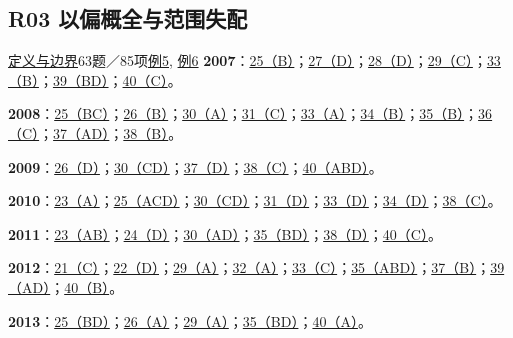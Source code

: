 \documentclass[11pt,a4paper]{article}
\begin{document}
\subsection{R03 以偏概全与范围失配}\label{class-R03}
\noindent \hyperref[cat-R03]{定义与边界}\quad 63题／85项\quad \hyperref[case-2008-T3-Q33]{例5}, \hyperref[case-2014-T4-Q38]{例6}
\noindent\textbf{2007}：\hyperref[idx-2007-T1-Q25]{25（B）}；\hyperref[idx-2007-T2-Q27]{27（D）}；\hyperref[idx-2007-T2-Q28]{28（D）}；\hyperref[idx-2007-T2-Q29]{29（C）}；\hyperref[idx-2007-T3-Q33]{33（B）}；\hyperref[idx-2007-T4-Q39]{39（BD）}；\hyperref[idx-2007-T4-Q40]{40（C）}。\par
\noindent\textbf{2008}：\hyperref[idx-2008-T1-Q25]{25（BC）}；\hyperref[idx-2008-T2-Q26]{26（B）}；\hyperref[idx-2008-T2-Q30]{30（A）}；\hyperref[idx-2008-T3-Q31]{31（C）}；\hyperref[idx-2008-T3-Q33]{33（A）}；\hyperref[idx-2008-T3-Q34]{34（B）}；\hyperref[idx-2008-T3-Q35]{35（B）}；\hyperref[idx-2008-T4-Q36]{36（C）}；\hyperref[idx-2008-T4-Q37]{37（AD）}；\hyperref[idx-2008-T4-Q38]{38（B）}。\par
\noindent\textbf{2009}：\hyperref[idx-2009-T2-Q26]{26（D）}；\hyperref[idx-2009-T2-Q30]{30（CD）}；\hyperref[idx-2009-T4-Q37]{37（D）}；\hyperref[idx-2009-T4-Q38]{38（C）}；\hyperref[idx-2009-T4-Q40]{40（ABD）}。\par
\noindent\textbf{2010}：\hyperref[idx-2010-T1-Q23]{23（A）}；\hyperref[idx-2010-T1-Q25]{25（ACD）}；\hyperref[idx-2010-T2-Q30]{30（CD）}；\hyperref[idx-2010-T3-Q31]{31（D）}；\hyperref[idx-2010-T3-Q33]{33（D）}；\hyperref[idx-2010-T3-Q34]{34（D）}；\hyperref[idx-2010-T4-Q38]{38（C）}。\par
\noindent\textbf{2011}：\hyperref[idx-2011-T1-Q23]{23（AB）}；\hyperref[idx-2011-T1-Q24]{24（D）}；\hyperref[idx-2011-T2-Q30]{30（AD）}；\hyperref[idx-2011-T3-Q35]{35（BD）}；\hyperref[idx-2011-T4-Q38]{38（D）}；\hyperref[idx-2011-T4-Q40]{40（C）}。\par
\noindent\textbf{2012}：\hyperref[idx-2012-T1-Q21]{21（C）}；\hyperref[idx-2012-T1-Q22]{22（D）}；\hyperref[idx-2012-T2-Q29]{29（A）}；\hyperref[idx-2012-T3-Q32]{32（A）}；\hyperref[idx-2012-T3-Q33]{33（C）}；\hyperref[idx-2012-T3-Q35]{35（ABD）}；\hyperref[idx-2012-T4-Q37]{37（B）}；\hyperref[idx-2012-T4-Q39]{39（AD）}；\hyperref[idx-2012-T4-Q40]{40（B）}。\par
\noindent\textbf{2013}：\hyperref[idx-2013-T1-Q25]{25（BD）}；\hyperref[idx-2013-T2-Q26]{26（A）}；\hyperref[idx-2013-T2-Q29]{29（A）}；\hyperref[idx-2013-T3-Q35]{35（BD）}；\hyperref[idx-2013-T4-Q40]{40（A）}。\par
\end{document}
